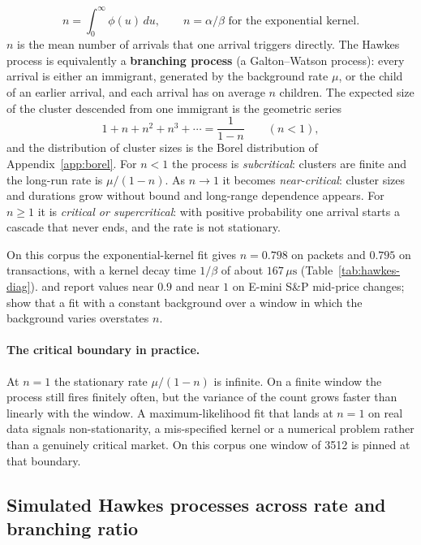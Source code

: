 $$n = \int_0^\infty \phi(u)\, du, \qquad n = \alpha/\beta \text{ for the exponential kernel}.$$
$n$ is the mean number of arrivals that one arrival triggers directly. The Hawkes process
is equivalently a \textbf{branching process} (a Galton--Watson process): every arrival is
either an immigrant, generated by the background rate $\mu$, or the child of an earlier
arrival, and each arrival has on average $n$ children. The expected size of the cluster
descended from one immigrant is the geometric series
$$1 + n + n^2 + n^3 + \cdots = \frac{1}{1 - n} \qquad (n < 1),$$
and the distribution of cluster sizes is the Borel distribution of
Appendix~\ref{app:borel}. For $n < 1$ the process is \emph{subcritical}: clusters are
finite and the long-run rate is $\mu / (1 - n)$. As $n \to 1$ it becomes
\emph{near-critical}: cluster sizes and durations grow without bound and long-range
dependence appears. For $n \geq 1$ it is \emph{critical or supercritical}: with positive
probability one arrival starts a cascade that never ends, and the rate is not stationary.

On this corpus the exponential-kernel fit gives $n = 0.798$ on packets and $0.795$ on
transactions, with a kernel decay time $1/\beta$ of about $167\,\mu\mathrm{s}$
(Table~\ref{tab:hawkes-diag}). \citet{filimonovsornette2012} and
\citet{hardimanbercotbouchaud2013} report values near $0.9$ and near $1$ on E-mini S\&P
mid-price changes; \citet{filimonovsornette2015} show that a fit with a constant
background over a window in which the background varies overstates $n$.

\paragraph{The critical boundary in practice.} At $n = 1$ the stationary rate
$\mu/(1-n)$ is infinite. On a finite window the process still fires finitely often, but
the variance of the count grows faster than linearly with the window. A maximum-likelihood
fit that lands at $n = 1$ on real data signals non-stationarity, a mis-specified kernel
or a numerical problem rather than a genuinely critical market. On this corpus one window
of 3512 is pinned at that boundary.

\subsection{Simulated Hawkes processes across rate and branching ratio}
\label{app:pp-visualise}

